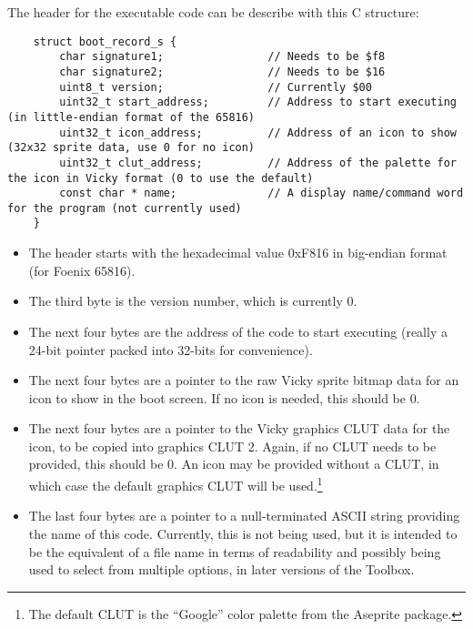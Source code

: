 The header for the executable code can be describe with this C structure:
\begin{lstlisting}
	struct boot_record_s {
		char signature1;				// Needs to be $f8
		char signature2;				// Needs to be $16
		uint8_t version;				// Currently $00
		uint32_t start_address;			// Address to start executing (in little-endian format of the 65816)
		uint32_t icon_address;			// Address of an icon to show (32x32 sprite data, use 0 for no icon)
		uint32_t clut_address;			// Address of the palette for the icon in Vicky format (0 to use the default)
		const char * name;				// A display name/command word for the program (not currently used)
	}
\end{lstlisting}

\begin{itemize}
	\item The header starts with the hexadecimal value 0xF816 in big-endian format (for Foenix 65816).
	\item The third byte is the version number, which is currently 0.
	\item The next four bytes are the address of the code to start executing (really a 24-bit pointer packed into 32-bits for convenience).
	\item The next four bytes are a pointer to the raw Vicky sprite bitmap data for an icon to show in the boot screen.
	      If no icon is needed, this should be 0.
	\item The next four bytes are a pointer to the Vicky graphics CLUT data for the icon, to be copied into graphics CLUT 2.
	      Again, if no CLUT needs to be provided, this should be 0. An icon may be provided without a CLUT, in which case the default
		  graphics CLUT will be used.\footnote{The default CLUT is the ``Google'' color palette from the Aseprite package.}
	\item The last four bytes are a pointer to a null-terminated ASCII string providing the name of this code. Currently, this is
	      not being used, but it is intended to be the equivalent of a file name in terms of readability and possibly being used
		  to select from multiple options, in later versions of the Toolbox.
\end{itemize}